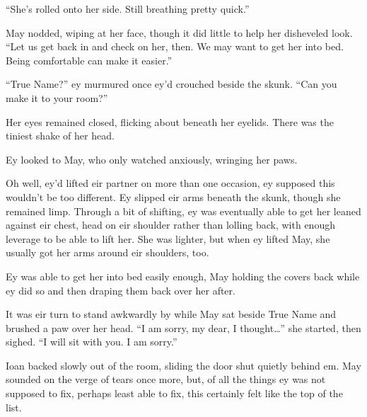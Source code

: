 ``She's rolled onto her side. Still breathing pretty quick.''

May nodded, wiping at her face, though it did little to help her disheveled look. ``Let us get back in and check on her, then. We may want to get her into bed. Being comfortable can make it easier.''

``True Name?'' ey murmured once ey'd crouched beside the skunk. ``Can you make it to your room?''

Her eyes remained closed, flicking about beneath her eyelids. There was the tiniest shake of her head.

Ey looked to May, who only watched anxiously, wringing her paws.

Oh well, ey'd lifted eir partner on more than one occasion, ey supposed this wouldn't be too different. Ey slipped eir arms beneath the skunk, though she remained limp. Through a bit of shifting, ey was eventually able to get her leaned against eir chest, head on eir shoulder rather than lolling back, with enough leverage to be able to lift her. She was lighter, but when ey lifted May, she usually got her arms around eir shoulders, too.

Ey was able to get her into bed easily enough, May holding the covers back while ey did so and then draping them back over her after.

It was eir turn to stand awkwardly by while May sat beside True Name and brushed a paw over her head. ``I am sorry, my dear, I thought\ldots{}'' she started, then sighed. ``I will sit with you. I am sorry.''

Ioan backed slowly out of the room, sliding the door shut quietly behind em. May sounded on the verge of tears once more, but, of all the things ey was not supposed to fix, perhaps least able to fix, this certainly felt like the top of the list.
